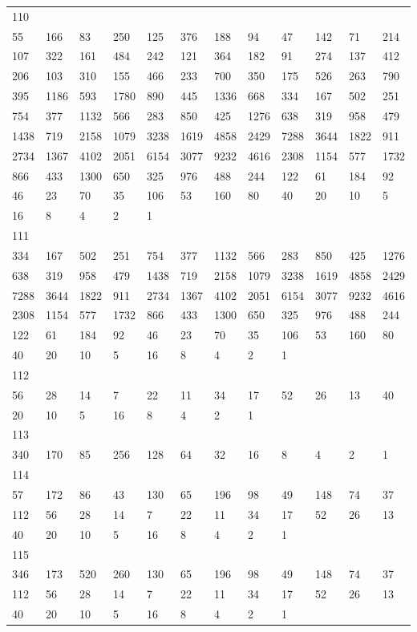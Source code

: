 \begin{longtable}{llllllllllll}
110&&&&&&&&&&&\\
55& 166& 83& 250& 125& 376& 188& 94& 47& 142& 71& 214\\
107& 322& 161& 484& 242& 121& 364& 182& 91& 274& 137& 412\\
206& 103& 310& 155& 466& 233& 700& 350& 175& 526& 263& 790\\
395& 1186& 593& 1780& 890& 445& 1336& 668& 334& 167& 502& 251\\
754& 377& 1132& 566& 283& 850& 425& 1276& 638& 319& 958& 479\\
1438& 719& 2158& 1079& 3238& 1619& 4858& 2429& 7288& 3644& 1822& 911\\
2734& 1367& 4102& 2051& 6154& 3077& 9232& 4616& 2308& 1154& 577& 1732\\
866& 433& 1300& 650& 325& 976& 488& 244& 122& 61& 184& 92\\
46& 23& 70& 35& 106& 53& 160& 80& 40& 20& 10& 5\\
16& 8& 4& 2& 1& \\

111&&&&&&&&&&&\\
334& 167& 502& 251& 754& 377& 1132& 566& 283& 850& 425& 1276\\
638& 319& 958& 479& 1438& 719& 2158& 1079& 3238& 1619& 4858& 2429\\
7288& 3644& 1822& 911& 2734& 1367& 4102& 2051& 6154& 3077& 9232& 4616\\
2308& 1154& 577& 1732& 866& 433& 1300& 650& 325& 976& 488& 244\\
122& 61& 184& 92& 46& 23& 70& 35& 106& 53& 160& 80\\
40& 20& 10& 5& 16& 8& 4& 2& 1& \\

112&&&&&&&&&&&\\
56& 28& 14& 7& 22& 11& 34& 17& 52& 26& 13& 40\\
20& 10& 5& 16& 8& 4& 2& 1& \\

113&&&&&&&&&&&\\
340& 170& 85& 256& 128& 64& 32& 16& 8& 4& 2& 1\\

114&&&&&&&&&&&\\
57& 172& 86& 43& 130& 65& 196& 98& 49& 148& 74& 37\\
112& 56& 28& 14& 7& 22& 11& 34& 17& 52& 26& 13\\
40& 20& 10& 5& 16& 8& 4& 2& 1& \\

115&&&&&&&&&&&\\
346& 173& 520& 260& 130& 65& 196& 98& 49& 148& 74& 37\\
112& 56& 28& 14& 7& 22& 11& 34& 17& 52& 26& 13\\
40& 20& 10& 5& 16& 8& 4& 2& 1& \\


\end{longtable}
